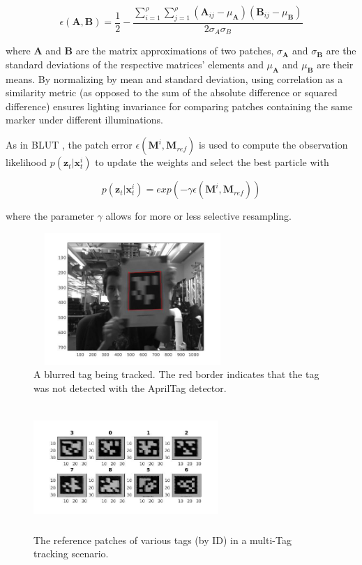 \documentclass[letterpaper, 10 pt, conference]{ieeeconf}
\renewcommand{\vec}[1]{\boldsymbol{#1}}
\begin{document}
\begin{equation}
	\epsilon(\vec{A}, \vec{B}) = \frac{1}{2} - \frac{\sum_{i=1}^{\rho} \sum_{j=1}^{\rho} (\vec{A}_{ij} - \mu_{\vec{A}})(\vec{B}_{ij} - \mu_{\vec{B}}) }{2\sigma_{A} \sigma_{B}}
\end{equation}

where $\vec{A}$ and $\vec{B}$ are the matrix approximations of two patches, $\sigma_{\vec{A}}$ and $\sigma_{\vec{B}}$ are the standard deviations of the respective matrices' elements and $\mu_{\vec{A}}$ and $\mu_{\vec{B}}$ are their means. By normalizing by mean and standard deviation, using correlation as a similarity metric (as opposed to the sum of the absolute difference or squared difference) ensures lighting invariance for comparing patches containing the same marker under different illuminations.


As in BLUT \citep{BLUT}, the patch error $\epsilon(\vec{M}^{i}, \vec{M}_{ref})$ is used to compute the observation likelihood $p(\vec{z}_t|\vec{x}^i_t)$ to update the weights and select the best particle with


\begin{equation}
	p(\vec{z}_t|\vec{x}^i_t) = exp(-\gamma \epsilon(\vec{M}^i, \vec{M}_{ref}))
\end{equation}

where the parameter $\gamma$ allows for more or less selective resampling.


\begin{figure}[b]
	\centering
	\includegraphics[width=7.5cm,height=5cm]{tracked_tag}
	\caption{A blurred tag being tracked. The red border indicates that the tag was not detected with the AprilTag detector.}
\end{figure}

\begin{figure}
	\centering
	\includegraphics[width=7cm,height=4.75cm]{RefPatches}
	\caption{The reference patches of various tags (by ID) in a multi-Tag tracking scenario.}
\end{figure}
\end{document}
